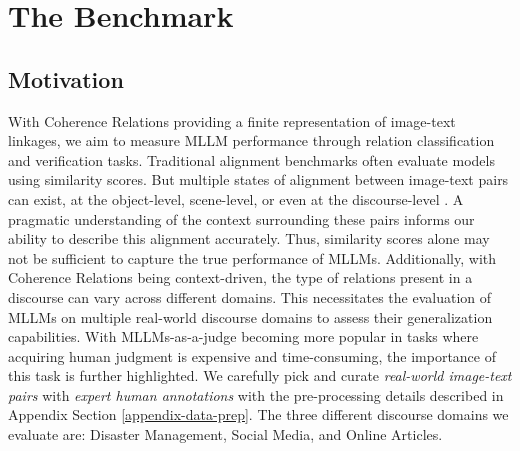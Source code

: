 \section{The {\name} Benchmark}

\subsection{Motivation}
With Coherence Relations providing a finite representation of image-text linkages, we aim to measure MLLM performance through relation classification and verification tasks. Traditional alignment benchmarks often evaluate models using similarity scores. But multiple states of alignment between image-text pairs can exist, at the object-level, scene-level, or even at the discourse-level \cite{Xu2022-ie}. A pragmatic understanding of the context surrounding these pairs informs our ability to describe this alignment accurately. Thus, similarity scores alone may not be sufficient to capture the true performance of MLLMs. Additionally, with Coherence Relations being context-driven, the type of relations present in a discourse can vary across different domains. This necessitates the evaluation of MLLMs on multiple real-world discourse domains to assess their generalization capabilities. With MLLMs-as-a-judge \cite{Chen2024-cr} becoming more popular in tasks where acquiring human judgment is expensive and time-consuming, the importance of this task is further highlighted. We carefully pick and curate \textit{real-world image-text pairs} with \textit{expert human annotations} with the pre-processing details described in Appendix Section \ref{appendix-data-prep}. The three different discourse domains we evaluate are: Disaster Management, Social Media, and Online Articles.

